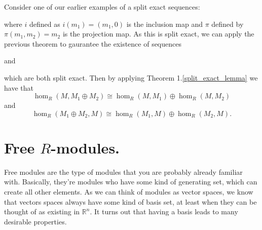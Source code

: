 \documentclass[12pt,letterpaper]{algebra_book}
\newcommand{\RR}{\mathbb{R}}
\theoremstyle{definition}
\begin{document}
\begin{prf}
    Consider one of our earlier examples of a split exact
    sequences:
    \begin{center}
    \end{center}
    where $i$ defined as $i(m_1) = (m_1, 0)$ is the inclusion map
    and $\pi$ defined by $\pi(m_1, m_2) = m_2$ is the projection
    map. As this is split exact, we can apply the previous theorem
    to gaurantee the existence of sequences 
    \begin{center}
    \end{center}
    and 
    \begin{center}
    \end{center}
    which are both split exact. Then by applying Theorem
    1.\ref{split_exact_lemma} we have that 
    \[
        \hom_R(M, M_1 \oplus M_2) \cong \hom_R(M, M_1) \oplus \hom_R(M, M_2)
    \]
    and 
    \[
        \hom_R(M_1 \oplus M_2, M) \cong \hom_R(M_1, M) \oplus \hom_R(M_2, M).
    \]
\end{prf}

\newpage
\section{Free $R$-modules.}
Free modules are the type of modules that you are probably
already familiar with. Basically, they're modules who have some
kind of generating set, which can create all other elements. As we
can think of modules as vector spaces, we know that vectors spaces
always have some kind of basis set, at least when they can be
thought of as existing in $\RR^n$. It turns out that having a
basis leads to many desirable properties. 
\end{document}
